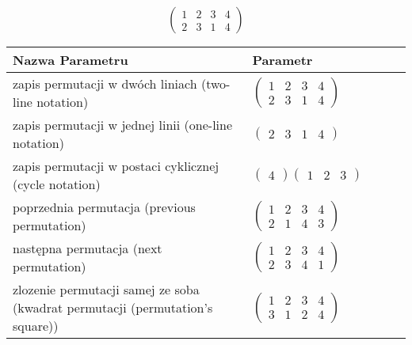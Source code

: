 \documentclass[12pt]{article}
\begin{document}
\subsection{}
\begin{center}
\[
\begin{pmatrix}
	1 & 2 & 3 & 4 \\ 
	2 & 3 & 1 & 4 
\end{pmatrix}
\]

\begin{tabular}{|m{0.6\linewidth}|m{0.4\linewidth}|}
	\hline
	Nazwa Parametru & Parametr \\
	\hline
	zapis permutacji w dwóch liniach (two-line notation) & $\begin{pmatrix} 1 & 2 & 3 & 4 \\ 
2 & 3 & 1 & 4 \end{pmatrix}$ \\ 
	\hline
	zapis permutacji w jednej linii (one-line notation) & $\begin{pmatrix} 2 & 3 & 1 & 4 \end{pmatrix}$ \\ 
	\hline
	zapis permutacji w postaci cyklicznej (cycle notation) & $\begin{pmatrix} 4 \end{pmatrix} \begin{pmatrix} 1 & 2 & 3 \end{pmatrix} $ \\ 
	\hline
	poprzednia permutacja (previous permutation) & $\begin{pmatrix} 1 & 2 & 3 & 4 \\ 
2 & 1 & 4 & 3 \end{pmatrix}$ \\ 
	\hline
	następna permutacja (next permutation) & $\begin{pmatrix} 1 & 2 & 3 & 4 \\ 
2 & 3 & 4 & 1 \end{pmatrix}$ \\ 
	\hline
	zlozenie permutacji samej ze soba (kwadrat permutacji (permutation's square)) & $\begin{pmatrix} 1 & 2 & 3 & 4 \\ 
3 & 1 & 2 & 4 \end{pmatrix}$ \\ 
	\hline
\end{tabular}
\end{center}
\end{document}
